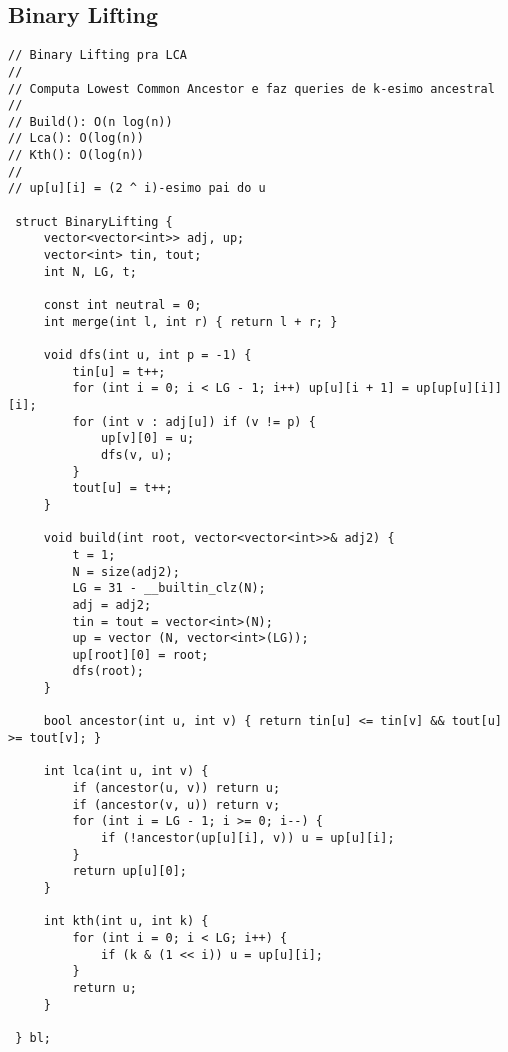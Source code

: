 \documentclass[11pt, a4paper, twoside]{article}
\begin{document}
\subsection{Binary Lifting}
\begin{lstlisting}
// Binary Lifting pra LCA
//
// Computa Lowest Common Ancestor e faz queries de k-esimo ancestral
//
// Build(): O(n log(n))
// Lca(): O(log(n))
// Kth(): O(log(n))
//
// up[u][i] = (2 ^ i)-esimo pai do u

 struct BinaryLifting {
     vector<vector<int>> adj, up;
     vector<int> tin, tout;
     int N, LG, t;
 
     const int neutral = 0;
     int merge(int l, int r) { return l + r; }
 
     void dfs(int u, int p = -1) {
         tin[u] = t++;
         for (int i = 0; i < LG - 1; i++) up[u][i + 1] = up[up[u][i]][i];
         for (int v : adj[u]) if (v != p) {
             up[v][0] = u;
             dfs(v, u);
         }
         tout[u] = t++;
     }
 
     void build(int root, vector<vector<int>>& adj2) {
         t = 1;
         N = size(adj2);
         LG = 31 - __builtin_clz(N);
         adj = adj2;
         tin = tout = vector<int>(N);
         up = vector (N, vector<int>(LG));
         up[root][0] = root;
         dfs(root);
     }
 
     bool ancestor(int u, int v) { return tin[u] <= tin[v] && tout[u] >= tout[v]; }
 
     int lca(int u, int v) {
         if (ancestor(u, v)) return u;
         if (ancestor(v, u)) return v;
         for (int i = LG - 1; i >= 0; i--) {
             if (!ancestor(up[u][i], v)) u = up[u][i];
         }
         return up[u][0];
     }
 
     int kth(int u, int k) {
         for (int i = 0; i < LG; i++) {
             if (k & (1 << i)) u = up[u][i];
         }
         return u;
     }
 
 } bl;
\end{lstlisting}
\end{document}
